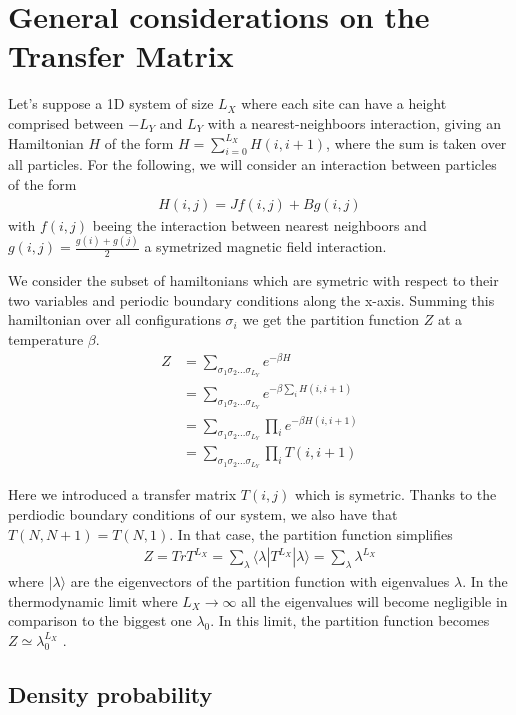 \section{General considerations on the Transfer Matrix}
Let's suppose a 1D system of size $L_X$ where each site can have a height comprised between $-L_Y$ and $L_Y$ with a nearest-neighboors interaction, giving an Hamiltonian $H$ of the form $H = \sum_{i=0}^{L_X} H(i,i+1)$, where the sum is taken over all particles. 
For the following, we will consider an interaction between particles of the form
\begin{align}
  H(i,j) = J f(i,j) + B g(i,j) 
  \label{hamiltonian}
\end{align}
with $f(i,j)$ beeing the interaction between nearest neighboors and $g(i,j) = \frac{g(i)+g(j)}{2}$ a symetrized magnetic field interaction.

We consider the subset of hamiltonians which are symetric with respect to their two variables and periodic boundary conditions along the x-axis.
Summing this hamiltonian over all configurations $\sigma_i$ we get the partition function $Z$ at a temperature $\beta$.
\begin{align*}
 Z &= \sum_{\sigma_1 \sigma_2 ... \sigma_{L_Y}} e^{- \beta H } \\
   &= \sum_{\sigma_1 \sigma_2 ... \sigma_{L_Y}} e^{- \beta \sum_{i} H(i,i+1)}  \\
   &= \sum_{\sigma_1 \sigma_2 ... \sigma_{L_Y}} \prod_{i} e^{-\beta H(i,i+1)} \\
   &= \sum_{\sigma_1 \sigma_2 ... \sigma_{L_Y}} \prod_{i} T(i,i+1)
\end{align*}

Here we introduced a transfer matrix $T(i,j)$ which is symetric. Thanks to the perdiodic boundary conditions of our system, we also have that $T(N,N+1) = T(N,1)$. In that case, the partition function simplifies 
\begin{align}
  Z = Tr T^{L_X}  = \sum_\lambda \langle\lambda | T^{L_X} | \lambda\rangle = \sum_\lambda \lambda^{L_X}
\end{align}
where $|\lambda\rangle$ are the eigenvectors of the partition function with eigenvalues $\lambda$. In the thermodynamic limit where ${L_X}  \rightarrow \infty$ all the eigenvalues will become negligible in comparison to the biggest one $\lambda_0$. 
In this limit, the partition function becomes $Z \simeq \lambda_0^{L_X}$ .

\subsection{Density probability}

